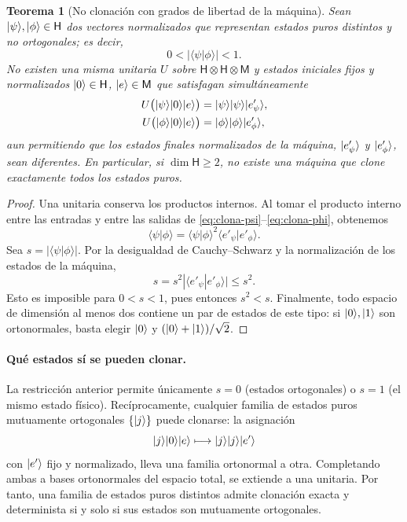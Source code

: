 \documentclass[letterpaper,12pt]{article}
\newtheorem{teorema}{Teorema}[section]
\numberwithin{equation}{section}
\begin{document}
\begin{teorema}[No clonación con grados de libertad de la máquina]
Sean ${\vert \psi \rangle},{\vert \phi \rangle}\in\mathsf H$ dos vectores normalizados
que representan estados puros distintos y no ortogonales; es decir,
\[
  0<|\langle\psi|\phi\rangle|<1.
\]
No existen una misma unitaria $U$ sobre
$\mathsf H\otimes\mathsf H\otimes\mathsf M$ y estados iniciales
fijos y normalizados ${\vert 0 \rangle}\in\mathsf H$, ${\vert e \rangle}\in\mathsf M$
que satisfagan simultáneamente
\begin{align}
  U\bigl({\vert \psi \rangle}{\vert 0 \rangle}{\vert e \rangle}\bigr)
    &={\vert \psi \rangle}{\vert \psi \rangle}{\vert e'_\psi \rangle},\label{eq:clona-psi}\\
  U\bigl({\vert \phi \rangle}{\vert 0 \rangle}{\vert e \rangle}\bigr)
    &={\vert \phi \rangle}{\vert \phi \rangle}{\vert e'_\phi \rangle},\label{eq:clona-phi}
\end{align}
aun permitiendo que los estados finales normalizados de la máquina,
${\vert e'_\psi \rangle}$ y ${\vert e'_\phi \rangle}$, sean diferentes.
En particular, si $\dim\mathsf H\geq2$, no existe una máquina que clone
exactamente todos los estados puros.
\end{teorema}

\begin{samepage}
\begin{proof}
Una unitaria conserva los productos internos. Al tomar el producto
interno entre las entradas y entre las salidas de
\eqref{eq:clona-psi}--\eqref{eq:clona-phi}, obtenemos
\begin{equation}
  \langle\psi|\phi\rangle
    =\langle\psi|\phi\rangle^2
      \langle e'_\psi|e'_\phi\rangle.
\end{equation}
Sea $s=|\langle\psi|\phi\rangle|$. Por la desigualdad de
Cauchy--Schwarz y la normalización de los estados de la máquina,
\[
  s=s^2|\langle e'_\psi|e'_\phi\rangle|\leq s^2.
\]
Esto es imposible para $0<s<1$, pues entonces $s^2<s$.
Finalmente, todo espacio de dimensión al menos dos contiene un par de
estados de este tipo: si ${\vert 0 \rangle},{\vert 1 \rangle}$ son ortonormales, basta
elegir ${\vert 0 \rangle}$ y $({\vert 0 \rangle}+{\vert 1 \rangle})/\sqrt2$.
\end{proof}
\end{samepage}

\paragraph{Qué estados sí se pueden clonar.}
La restricción anterior permite únicamente $s=0$ (estados ortogonales)
o $s=1$ (el mismo estado físico). Recíprocamente, cualquier familia de
estados puros mutuamente ortogonales $\{{\vert j \rangle}\}$ puede clonarse:
la asignación
\[
  {\vert j \rangle}{\vert 0 \rangle}{\vert e \rangle}\longmapsto{\vert j \rangle}{\vert j \rangle}{\vert e' \rangle}
\]
con ${\vert e' \rangle}$ fijo y normalizado, lleva una familia ortonormal a otra.
Completando ambas a bases
ortonormales del espacio total, se extiende a una unitaria.
Por tanto, una familia de estados puros distintos admite clonación
exacta y determinista si y solo si sus estados son mutuamente ortogonales.
\end{document}
